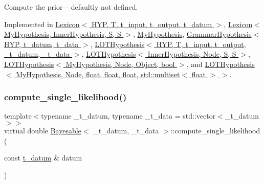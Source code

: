 Compute the prior -- defaultly not defined. 



Implemented in \hyperlink{class_lexicon_a1edc72e7c3b422d1c13b6cc3eb33d08d}{Lexicon$<$ H\+Y\+P, T, t\+\_\+input, t\+\_\+output, t\+\_\+datum $>$}, \hyperlink{class_lexicon_a1edc72e7c3b422d1c13b6cc3eb33d08d}{Lexicon$<$ My\+Hypothesis, Inner\+Hypothesis, S, S $>$}, \hyperlink{class_my_hypothesis_ab092094c5fc31730de4f40609220bb18}{My\+Hypothesis}, \hyperlink{class_grammar_hypothesis_a11fd75eee387330535601c9ee9d2f0f9}{Grammar\+Hypothesis$<$ H\+Y\+P, t\+\_\+datum, t\+\_\+data $>$}, \hyperlink{class_l_o_t_hypothesis_a80eea871bc115e4ef585f75f06857b39}{L\+O\+T\+Hypothesis$<$ H\+Y\+P, T, t\+\_\+input, t\+\_\+output, \+\_\+t\+\_\+datum, \+\_\+t\+\_\+data $>$}, \hyperlink{class_l_o_t_hypothesis_a80eea871bc115e4ef585f75f06857b39}{L\+O\+T\+Hypothesis$<$ Inner\+Hypothesis, Node, S, S $>$}, \hyperlink{class_l_o_t_hypothesis_a80eea871bc115e4ef585f75f06857b39}{L\+O\+T\+Hypothesis$<$ My\+Hypothesis, Node, Object, bool $>$}, and \hyperlink{class_l_o_t_hypothesis_a80eea871bc115e4ef585f75f06857b39}{L\+O\+T\+Hypothesis$<$ My\+Hypothesis, Node, float, float, float, std\+::multiset$<$ float $>$ $>$}.

\mbox{\label{class_bayesable_a5e0237ec7a40a2c45c990f93a8dc8e00}} 
\subsubsection{\texorpdfstring{compute\+\_\+single\+\_\+likelihood()}{compute\_single\_likelihood()}}
{\footnotesize\ttfamily template$<$typename \+\_\+t\+\_\+datum, typename \+\_\+t\+\_\+data = std\+::vector$<$\+\_\+t\+\_\+datum$>$$>$ \\
virtual double \hyperlink{class_bayesable}{Bayesable}$<$ \+\_\+t\+\_\+datum, \+\_\+t\+\_\+data $>$\+::compute\+\_\+single\+\_\+likelihood (\begin{DoxyParamCaption}\item[{const \hyperlink{class_bayesable_a7c93a2eeab708378eb321745908718d4}{t\+\_\+datum} \&}]{datum }\end{DoxyParamCaption})\hspace{0.3cm}{\ttfamily [pure virtual]}}



